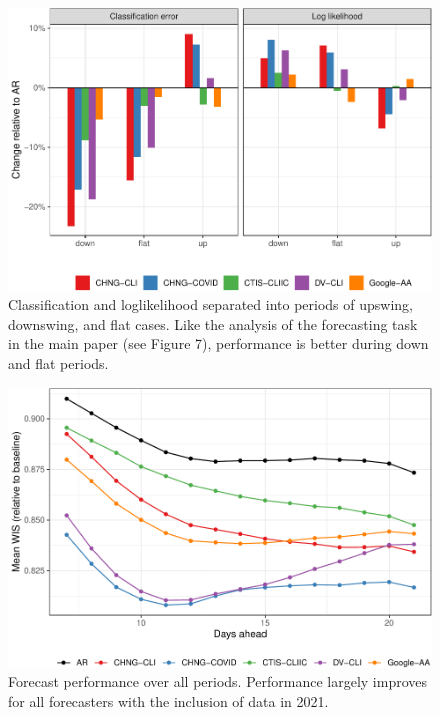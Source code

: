 \documentclass[9pt,twoside,lineno]{pnas-new}
\begin{document}
\clearpage

\begin{figure}

{\centering \includegraphics[width=\textwidth]{fig/hotspots-upswing-downswing-1} 

}

\caption{Classification and loglikelihood separated into periods of upswing, downswing, and flat cases. Like the analysis of the forecasting task in the main paper (see Figure 7), performance is better during down and flat periods.}\label{fig:hotspots-upswing-downswing}
\end{figure}

\clearpage

\begin{figure}

{\centering \includegraphics[width=\textwidth]{fig/fcast-alldates-1} 

}

\caption{Forecast performance over all periods. Performance largely improves for all forecasters with the inclusion of data in 2021.}\label{fig:fcast-alldates}
\end{figure}
\end{document}
